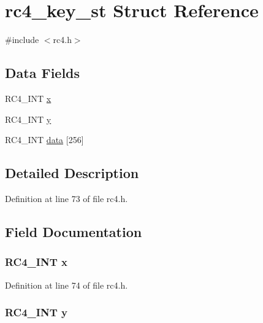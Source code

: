 \hypertarget{structrc4__key__st}{}\section{rc4\+\_\+key\+\_\+st Struct Reference}
\label{structrc4__key__st}


{\ttfamily \#include $<$rc4.\+h$>$}

\subsection*{Data Fields}
\begin{DoxyCompactItemize}
\item 
R\+C4\+\_\+\+I\+NT \hyperlink{structrc4__key__st_a0bd6a8aaaa14fa4f32a520389c4213e9}{x}
\item 
R\+C4\+\_\+\+I\+NT \hyperlink{structrc4__key__st_a5622e22c1b317806c21cc3f76815f07c}{y}
\item 
R\+C4\+\_\+\+I\+NT \hyperlink{structrc4__key__st_a2baaa96472216bbb3d5aa80f5ebd2bfc}{data} \mbox{[}256\mbox{]}
\end{DoxyCompactItemize}


\subsection{Detailed Description}


Definition at line 73 of file rc4.\+h.



\subsection{Field Documentation}
\subsubsection[{\texorpdfstring{x}{x}}]{\setlength{\rightskip}{0pt plus 5cm}R\+C4\+\_\+\+I\+NT x}\hypertarget{structrc4__key__st_a0bd6a8aaaa14fa4f32a520389c4213e9}{}\label{structrc4__key__st_a0bd6a8aaaa14fa4f32a520389c4213e9}


Definition at line 74 of file rc4.\+h.

\subsubsection[{\texorpdfstring{y}{y}}]{\setlength{\rightskip}{0pt plus 5cm}R\+C4\+\_\+\+I\+NT y}\hypertarget{structrc4__key__st_a5622e22c1b317806c21cc3f76815f07c}{}\label{structrc4__key__st_a5622e22c1b317806c21cc3f76815f07c}


